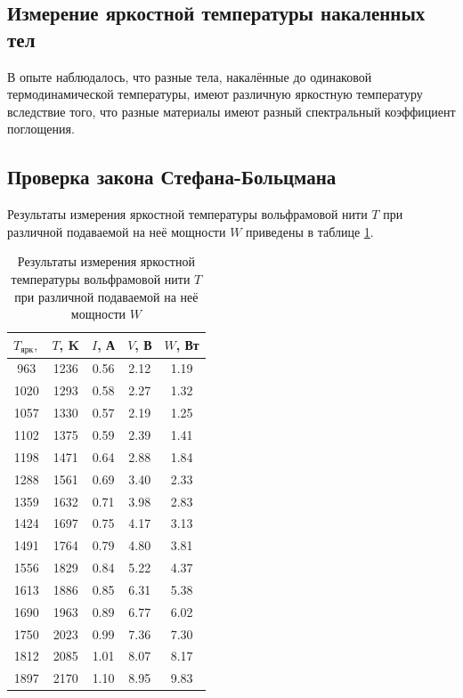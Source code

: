 \documentclass[a4paper, 12pt]{article}
\begin{document}
    \subsection{Измерение яркостной температуры накаленных тел}

    В опыте наблюдалось, что разные тела, накалённые до одинаковой термодинамической температуры, имеют различную яркостную температуру вследствие того, что разные материалы имеют разный спектральный коэффициент поглощения.
 
    \subsection{Проверка закона Стефана-Больцмана}

    Результаты измерения яркостной температуры вольфрамовой нити $T$ при различной подаваемой на неё мощности $W$ приведены в таблице \ref{table:stefan_boltzmann}.
    
    \begin{table}[H]
        \centering
        \addtolength{\tabcolsep}{-4pt}
        \footnotesize
        \begin{tabular}{ccccc}
            \toprule
            $T_\text{ярк}, $ & $T$, K & $I$, А & $V$, В & $W$, Вт \\
            \midrule
            963  & 1236 & 0.56 & 2.12 & 1.19 \\
            1020 & 1293 & 0.58 & 2.27 & 1.32 \\
            1057 & 1330 & 0.57 & 2.19 & 1.25 \\
            1102 & 1375 & 0.59 & 2.39 & 1.41 \\
            1198 & 1471 & 0.64 & 2.88 & 1.84 \\
            1288 & 1561 & 0.69 & 3.40 & 2.33 \\
            1359 & 1632 & 0.71 & 3.98 & 2.83 \\
            1424 & 1697 & 0.75 & 4.17 & 3.13 \\
            1491 & 1764 & 0.79 & 4.80 & 3.81 \\
            1556 & 1829 & 0.84 & 5.22 & 4.37 \\
            1613 & 1886 & 0.85 & 6.31 & 5.38 \\
            1690 & 1963 & 0.89 & 6.77 & 6.02 \\
            1750 & 2023 & 0.99 & 7.36 & 7.30 \\
            1812 & 2085 & 1.01 & 8.07 & 8.17 \\
            1897 & 2170 & 1.10 & 8.95 & 9.83 \\
            \bottomrule
        \end{tabular}
        \caption{Результаты измерения яркостной температуры вольфрамовой нити $T$ при различной подаваемой на неё мощности $W$}
	\label{table:stefan_boltzmann}
    \end{table}
\end{document}
